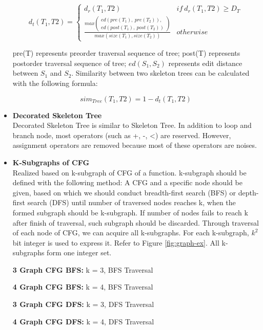 \begin{itemize}
	\begin{equation}
	d_{t}(T_{1}, T{2})=\begin{cases}d_{r}(T_{1}, T{2}) & if~d_{r}(T_{1}, T{2})\geq D_{T}\\\frac{max\left(\begin{array}{c}ed(pre(T_{1}),~pre(T_{2})),\\ ed(post(T_{1}),~post(T_{2}))\end{array}\right)}{max(size(T_{1}), size(T_{2}))} & otherwise\end{cases}
	\end{equation}

	pre(T) represents preorder traversal sequence of tree; post(T) represents postorder traversal sequence of tree; $ed(S_{1}, S_{2})$ represents edit distance between $S_{1}$ and $S_{2}$. Similarity between two skeleton trees can be calculated with the following formula:

	\begin{equation}
	sim_{Tree}(T_{1}, T{2})=1-d_{t}(T_{1}, T{2})
	\end{equation}

	\item \textbf{Decorated Skeleton Tree} \\
	Decorated Skeleton Tree is similar to Skeleton Tree. In addition to loop and branch node, most operators (such as +, -, <) are reserved. However, assignment operators are removed because most of these operators are noises.
	\item \textbf{K-Subgraphs of CFG} \\
	Realized based on k-subgraph of CFG of a function. k-subgraph should be defined with the following method: A CFG and a specific node should be given, based on which we should conduct breadth-first search (BFS) or depth-first search (DFS) until number of traversed nodes reaches k, when the formed subgraph should be k-subgraph. If number of nodes fails to reach k after finish of traversal, such subgraph should be discarded. Through traversal of each node of CFG, we can acquire all k-subgraphs. For each k-subgraph, $k^2$ bit integer is used to express it. Refer to Figure \ref{fig:graph-ex}. All k-subgraphs form one integer set.

	\textbf{3 Graph CFG BFS:} k = 3, BFS Traversal

	\textbf{4 Graph CFG BFS:} k = 4, BFS Traversal

	\textbf{3 Graph CFG DFS:} k = 3, DFS Traversal

	\textbf{4 Graph CFG DFS:} k = 4, DFS Traversal


\end{itemize}

